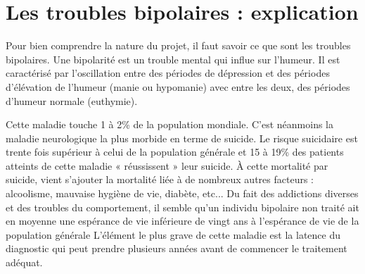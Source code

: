 \section{Les troubles bipolaires : explication}

Pour bien comprendre la nature du projet, il faut savoir ce que sont les troubles bipolaires.
Une bipolarité est un trouble mental qui influe sur l'humeur. Il est caractérisé par l'oscillation entre des périodes de dépression et des périodes d'élévation de l'humeur (manie ou hypomanie) avec entre les deux,
des périodes d'humeur \og{} normale \fg{} (euthymie).

Cette maladie touche 1 à 2\% de la population mondiale. C'est néanmoins la maladie neurologique la plus morbide en terme de suicide. Le risque suicidaire est trente fois supérieur à celui de la population générale et 15 à 19\% des patients atteints de cette maladie « réussissent » leur suicide. À cette mortalité par suicide, vient s’ajouter la mortalité liée à de nombreux autres facteurs :  alcoolisme, mauvaise hygiène de vie, diabète, etc... Du fait des addictions diverses et des troubles du comportement, il semble qu’un individu bipolaire non traité ait en moyenne une espérance de vie inférieure de vingt ans à l'espérance de vie de la population générale
L'élément le plus grave de cette maladie est la latence du diagnostic qui peut prendre plusieurs années avant de commencer le traitement adéquat. 
